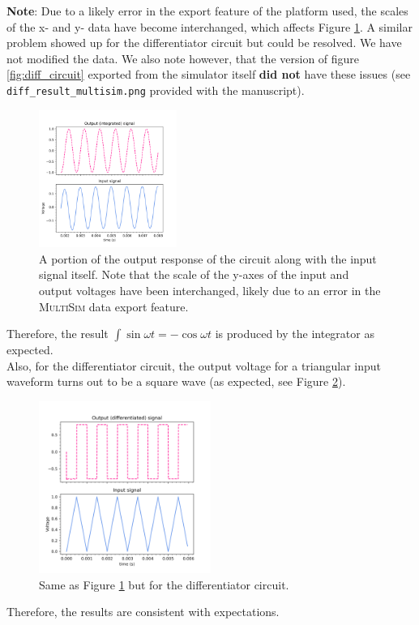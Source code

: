 \documentclass{article}
\begin{document}
	\textbf{Note}: Due to a likely error in the export feature of the platform used, the scales of the x- and y- data have become interchanged, which affects Figure \ref{fig:integ_result}. A similar problem showed up for the differentiator circuit but could be resolved. We have not modified the data. We also note however, that the version of figure \ref{fig:diff_circuit} exported from the simulator itself {\bf did not} have these issues (see {\tt diff\_result\_multisim.png} provided with the manuscript).
	
	\begin{figure}[h!]
		\centering
		\includegraphics[width=0.4\textwidth]{integrator_result}
		\caption{A portion of the output response of the circuit along with the input signal itself. Note that the scale of the y-axes of the input and output voltages have been interchanged, likely due to an error in the \textsc{MultiSim} data export feature.}
		\label{fig:integ_result}
	\end{figure}
	
	Therefore, the result $\int \sin \omega t = - \cos \omega t$ is produced by the integrator as expected.\\
	
	Also, for the differentiator circuit, the output voltage for a triangular input waveform turns out to be a square wave (as expected, see Figure \ref{fig:diff_result}).
	
	\begin{figure}[h!]
		\centering
		\includegraphics[width=0.5\textwidth]{diff_result}
		\caption{Same as Figure \ref{fig:integ_result} but for the differentiator circuit.}
		\label{fig:diff_result}
	\end{figure}

Therefore, the results are consistent with expectations.
\end{document}
